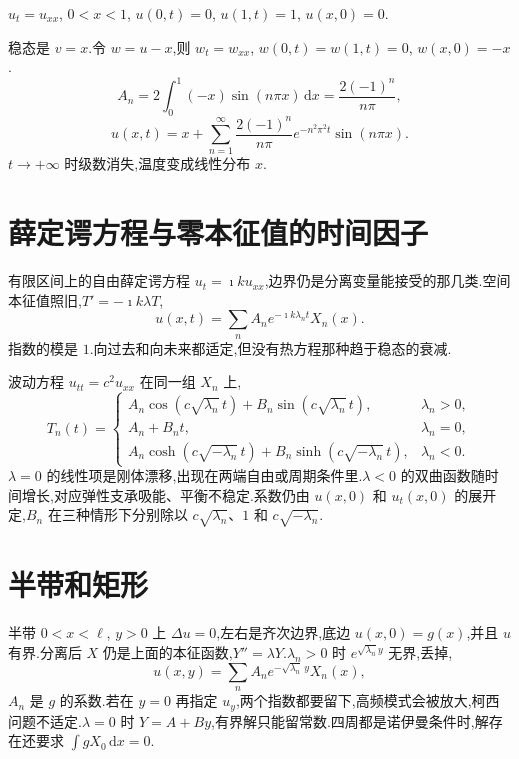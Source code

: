 \begin{example}
$u_t=u_{xx}$, $0<x<1$, $u(0,t)=0$, $u(1,t)=1$, $u(x,0)=0$.
\end{example}
\begin{solution}
稳态是 $v=x$.令 $w=u-x$,则 $w_t=w_{xx}$, $w(0,t)=w(1,t)=0$, $w(x,0)=-x$.
\begin{equation}
  A_n=2\int_0^1(-x)\sin(n\pi x)\,\mathrm{d}x=\frac{2(-1)^n}{n\pi},
\end{equation}
\begin{equation}
  u(x,t)=x+\sum_{n=1}^{\infty}\frac{2(-1)^n}{n\pi}e^{-n^2\pi^2 t}\sin(n\pi x).
\end{equation}
$t\to+\infty$ 时级数消失,温度变成线性分布 $x$.
\end{solution}

\section{薛定谔方程与零本征值的时间因子}
有限区间上的自由薛定谔方程 $u_t=\imath k u_{xx}$,边界仍是分离变量能接受的那几类.空间本征值照旧,$T'=-\imath k\lambda T$,
\begin{equation}
  u(x,t)=\sum_n A_n e^{-\imath k\lambda_n t}X_n(x).
\end{equation}
指数的模是 $1$.向过去和向未来都适定,但没有热方程那种趋于稳态的衰减.

波动方程 $u_{tt}=c^2 u_{xx}$ 在同一组 $X_n$ 上,
\begin{equation}
  T_n(t)=
  \begin{cases}
    A_n\cos(c\sqrt{\lambda_n}\,t)+B_n\sin(c\sqrt{\lambda_n}\,t), & \lambda_n>0,\\
    A_n+B_n t, & \lambda_n=0,\\
    A_n\cosh(c\sqrt{-\lambda_n}\,t)+B_n\sinh(c\sqrt{-\lambda_n}\,t), & \lambda_n<0.
  \end{cases}
\end{equation}
$\lambda=0$ 的线性项是刚体漂移,出现在两端自由或周期条件里.$\lambda<0$ 的双曲函数随时间增长,对应弹性支承吸能、平衡不稳定.系数仍由 $u(x,0)$ 和 $u_t(x,0)$ 的展开定,$B_n$ 在三种情形下分别除以 $c\sqrt{\lambda_n}$、$1$ 和 $c\sqrt{-\lambda_n}$.

\section{半带和矩形}
半带 $0<x<\ell$, $y>0$ 上 $\Delta u=0$,左右是齐次边界,底边 $u(x,0)=g(x)$,并且 $u$ 有界.分离后 $X$ 仍是上面的本征函数,$Y''=\lambda Y$.$\lambda_n>0$ 时 $e^{\sqrt{\lambda_n} y}$ 无界,丢掉,
\begin{equation}
  u(x,y)=\sum_n A_n e^{-\sqrt{\lambda_n}\,y}X_n(x),
\end{equation}
$A_n$ 是 $g$ 的系数.若在 $y=0$ 再指定 $u_y$,两个指数都要留下,高频模式会被放大,柯西问题不适定.$\lambda=0$ 时 $Y=A+By$,有界解只能留常数.四周都是诺伊曼条件时,解存在还要求 $\int g X_0\,\mathrm{d}x=0$.

